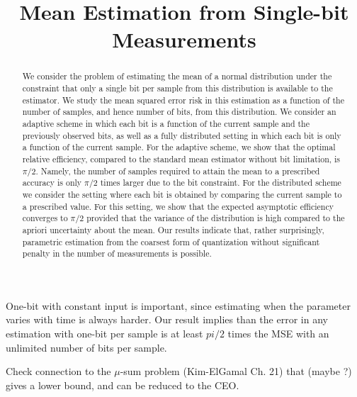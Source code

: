 \documentclass[letterpaper, conference]{IEEEtran}      %
\title{\LARGE \bf Mean Estimation from Single-bit Measurements}
\begin{document}
\graphicspath{{../Figs/}}
\maketitle
\thispagestyle{empty}
\pagestyle{empty}



\begin{abstract}
We consider the problem of estimating the mean of a normal distribution under the constraint that only a single bit per sample from this distribution is available to the estimator. We study the mean squared error risk in this estimation as a function of the number of samples, and hence number of bits, from this distribution. We consider an adaptive scheme in which each bit is a function of the current sample and the previously observed bits, as well as a fully distributed setting in which each bit is only a function of the current sample. For the adaptive scheme, we show that the optimal relative efficiency, compared to the standard mean estimator without bit limitation, is $\pi/2$. Namely, the number of samples required to attain the mean to a prescribed accuracy is only $\pi/2$ times larger due to the bit constraint. For the distributed scheme we consider the setting where each bit is obtained by comparing the current sample to a prescribed value. For this setting, we show that the expected asymptotic efficiency converges to $\pi/2$ provided that the variance of the distribution is high compared to the apriori uncertainty about the mean. Our results indicate that, rather surprisingly, parametric estimation from the coarsest form of quantization without significant penalty in the number of measurements is possible. 
\end{abstract}

{\color{red} 
One-bit with constant input is important, since estimating when the parameter varies with time is always harder. Our result implies than the error in any estimation with one-bit per sample is at least $pi/2$ times the MSE with an unlimited number of bits per sample.
 \\
}


{\color{red} Check connection to the $\mu$-sum problem (Kim-ElGamal Ch. 21) that (maybe ?) gives a lower bound, and can be reduced to the CEO.
}


\end{document}
